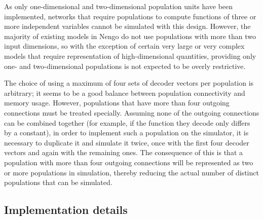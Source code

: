 \documentclass[english]{article}
\begin{document}
As only one-dimensional and two-dimensional population units have been implemented, networks that require populations to compute functions
of three or more independent variables cannot be simulated with this design.
However, the majority of existing models in Nengo do not use populations with more than two input dimensions, so with the exception of
certain very large or very complex models that require representation of high-dimensional quantities, providing only one- and two-dimensional
populations is not expected to be overly restrictive.

The choice of using a maximum of four sets of decoder vectors per population is arbitrary; it seems to be a good balance between
population connectivity and memory usage. However, populations that have more than four outgoing connections must be treated specially.
Assuming none of the outgoing connections can be combined together (for example, if the function they decode only differs by a constant),
in order to implement such a population on the simulator, it is necessary to duplicate it and simulate it twice,
once with the first four decoder vectors and again with the remaining ones. The consequence of this is that a population with more than
four outgoing connections will be represented as two or more populations in simulation, thereby reducing the actual number of
distinct populations that can be simulated.

\subsection{Implementation details}
\end{document}

